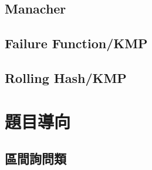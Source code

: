 	\subsection{Manacher}
		
	\subsection{Failure Function/KMP}
		
	\subsection{Rolling Hash/KMP}
		
\section{題目導向}
	\subsection{區間詢問類}
		
